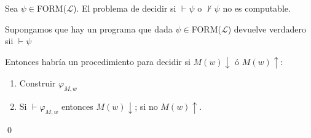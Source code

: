 \begin{teorema}
	Sea $\psi\in$FORM($\mathcal{L}$). El problema de decidir si $\vdash\psi$ o $\nvdash\psi$ no es computable.
\end{teorema}

\begin{demo}
	Supongamos que hay un programa que dada $\psi\in$FORM($\mathcal{L}$) devuelve verdadero sii $\vdash\psi$
	
	Entonces habría un procedimiento para decidir si $M(w)\downarrow$ ó $M(w)\uparrow$:
	\begin{enumerate}
		\item Construir $\varphi_{M,w}$
		\item Si $\vdash\varphi_{M,w}$ entonces $M(w)\downarrow$; si no $M(w)\uparrow$.
	\end{enumerate}\qed
\end{demo}
